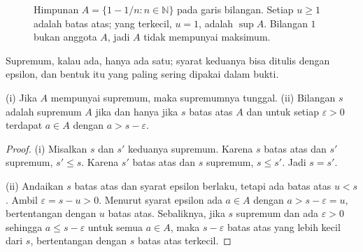 \begin{figure}[htbp]
\centering
{}
\caption{Himpunan $A=\{1-1/n:n\in\mathbb{N}\}$ pada garis bilangan. Setiap $u\ge 1$
adalah batas atas; yang terkecil, $u=1$, adalah $\sup A$. Bilangan $1$ bukan anggota
$A$, jadi $A$ tidak mempunyai maksimum.}
\label{fig:sup-garis}
\end{figure}


Supremum, kalau ada, hanya ada satu; syarat keduanya bisa ditulis dengan epsilon, dan
bentuk itu yang paling sering dipakai dalam bukti.

\begin{lemma}
(i) Jika $A$ mempunyai supremum, maka supremumnya tunggal. (ii) Bilangan $s$ adalah
supremum $A$ jika dan hanya jika $s$ batas atas $A$ dan untuk setiap
$\varepsilon>0$ terdapat $a\in A$ dengan $a>s-\varepsilon$.
\end{lemma}

\begin{proof}
(i) Misalkan $s$ dan $s'$ keduanya supremum. Karena $s$ batas atas dan $s'$ supremum,
$s'\le s$. Karena $s'$ batas atas dan $s$ supremum, $s\le s'$. Jadi $s=s'$.

(ii) Andaikan $s$ batas atas dan syarat epsilon berlaku, tetapi ada batas atas $u<s$.
Ambil $\varepsilon=s-u>0$. Menurut syarat epsilon ada $a\in A$ dengan
$a>s-\varepsilon=u$, bertentangan dengan $u$ batas atas. Sebaliknya, jika $s$ supremum
dan ada $\varepsilon>0$ sehingga $a\le s-\varepsilon$ untuk semua $a\in A$, maka
$s-\varepsilon$ batas atas yang lebih kecil dari $s$, bertentangan dengan $s$ batas
atas terkecil.
\end{proof}

